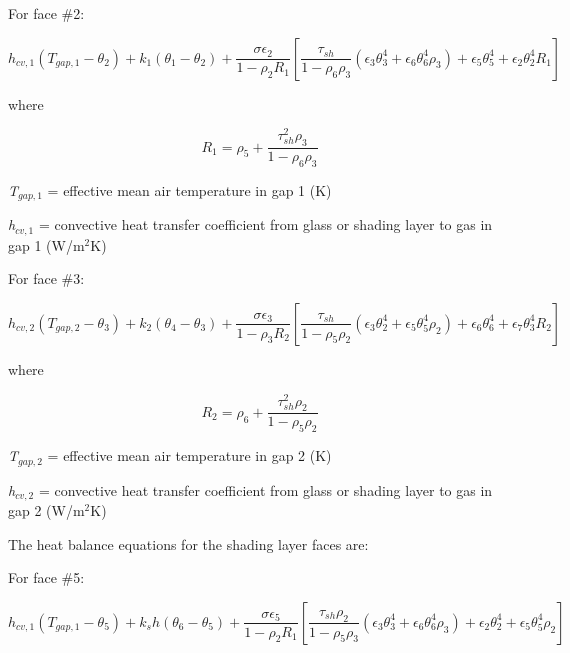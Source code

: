 For face \#2:

\begin{equation}
h_{cv,1} (T_{gap,1}-\theta_2) + k_1 (\theta_1-\theta_2) +
    \frac{\sigma \epsilon_2}{1-\rho_2 R_1} \left[
      \frac{\tau_{sh}}{1-\rho_6\rho_3} (
        \epsilon_3 \theta_3^4 + \epsilon_6\theta_6^4\rho_3
      )
      + \epsilon_5\theta_5^4 + \epsilon_2\theta_2^4R_1
    \right]
\end{equation}

where

\begin{equation}
{R_1} = {\rho_5} + \frac{{\tau_{sh}^2{\rho_3}}}{{1 - {\rho_6}{\rho_3}}}
\end{equation}

\emph{T\(_{gap,1}\)} = effective mean air temperature in gap 1 (K)

\emph{h\(_{cv,1}\)} = convective heat transfer coefficient from glass or shading layer to gas in gap 1 (W/m\(^{2}\)K)

For face \#3:

\begin{equation}
h_{cv,2} (T_{gap,2}-\theta_3) + k_2 (\theta_4-\theta_3) +
    \frac{\sigma \epsilon_3}{1-\rho_3 R_2} \left[
      \frac{\tau_{sh}}{1-\rho_5\rho_2} (
        \epsilon_3 \theta_2^4 + \epsilon_5\theta_5^4\rho_2
      )
      + \epsilon_6\theta_6^4 + \epsilon_7\theta_3^4R_2
    \right]
\end{equation}

where

\begin{equation}
{R_2} = {\rho_6} + \frac{{\tau_{sh}^2{\rho_2}}}{{1 - {\rho_5}{\rho_2}}}
\end{equation}

\emph{T\(_{gap,2}\)} = effective mean air temperature in gap 2 (K)

\emph{h\(_{cv,2}\)} = convective heat transfer coefficient from glass or shading layer to gas in gap 2 (W/m\(^{2}\)K)

The heat balance equations for the shading layer faces are:

For face \#5:

\begin{equation}
h_{cv,1} (T_{gap,1}-\theta_5) + k_sh (\theta_6-\theta_5) +
    \frac{\sigma \epsilon_5}{1-\rho_2 R_1} \left[
      \frac{\tau_{sh}\rho_2}{1-\rho_5\rho_3} (
        \epsilon_3 \theta_3^4 + \epsilon_6\theta_6^4\rho_3
      )
      + \epsilon_2\theta_2^4 + \epsilon_5\theta_5^4\rho_2
    \right]
\end{equation}

